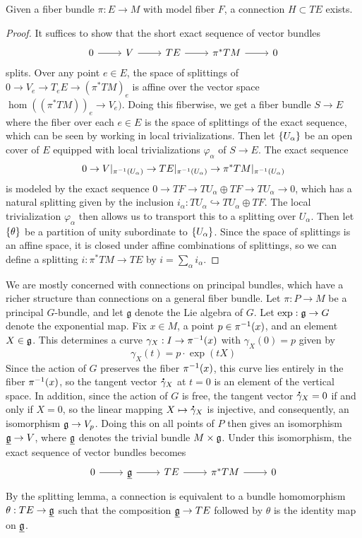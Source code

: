 %
\begin{prop}
Given a fiber bundle $\pi : E \to M$ with model fiber $F$, a connection
$H \subset TE$ exists.
\end{prop}
%
\begin{proof}
It suffices to show that the short exact sequence of vector bundles
\[\begin{tikzcd}
0 \ar[r] & V \ar[r] & TE \ar[r] & \pi^*TM \ar[r] & 0
\end{tikzcd}\]
splits. Over any point $e \in E$, the space of splittings of
$0 \to V_e \to T_eE \to (\pi^*TM)_e$ is affine over the vector space
$\hom((\pi^*TM))_e \to V_e)$. Doing this fiberwise, we get a fiber bundle
$S \to E$ where the fiber over each $e \in E$ is the space of splittings
of the exact sequence, which can be seen by working in local trivializations.
Then let $\left\lbrace U_\alpha \right\rbrace$ be an open cover of $E$ equipped with local
trivializations $\varphi_\alpha$ of $S \to E$. The exact sequence
\[
0 \to V\vert_{\pi^{-1}(U_\alpha)} \to TE\vert_{\pi^{-1}(U_\alpha)} \to
\pi^*TM\vert_{\pi^{-1}(U_\alpha)}
\]
is modeled by the exact sequence $0 \to TF \to TU_\alpha \oplus TF \to TU_\alpha \to 0$,
which has a natural splitting given by the inclusion
$i_\alpha : TU_\alpha \hookrightarrow TU_\alpha \oplus TF$. The local trivialization
$\varphi_\alpha$ then allows us to transport this to a splitting over $U_\alpha$.
Then let $\left\lbrace \theta \right\rbrace$ be a partition of unity subordinate to $\left\lbrace U_\alpha \right\rbrace$.
Since the space of splittings is an affine space, it is closed under affine
combinations of splittings, so we can define a splitting
$i : \pi^*TM \to TE$ by $i = \sum_\alpha i_\alpha$.
\end{proof}
We are mostly concerned with connections on principal bundles, which have a
richer structure than connections on a general fiber bundle. Let $\pi : P \to M$
be a principal $G$-bundle, and let $\mathfrak{g}$ denote the Lie algebra of $G$.
Let $\exp : \mathfrak{g} \to G$ denote the exponential map. Fix $x \in M$, a point
$p \in \pi^{-1}(x)$, and an element $X \in \mathfrak{g}$. This determines a curve
$\gamma_X : I \to \pi^{-1}(x)$ with $\gamma_X(0) = p$ given by
\[
\gamma_X(t) = p \cdot \exp(tX)
\]
Since the action of $G$ preserves the fiber $\pi^{-1}(x)$, this curve lies
entirely in the fiber $\pi^{-1}(x)$, so the tangent vector $\accentset{\mbox{\large\bfseries .}}{\gamma}_X$
at $t = 0$ is an element of the vertical space. In addition, since the
action of $G$ is free, the tangent vector $\accentset{\mbox{\large\bfseries .}}{\gamma}_X = 0$ if and only if
$X = 0$, so the linear mapping $X \mapsto \accentset{\mbox{\large\bfseries .}}{\gamma}_X$ is injective, and
consequently, an isomorphism $\mathfrak{g} \to V_p$. Doing this on all points of $P$
then gives an isomorphism $\underline{\mathfrak{g}} \to V$, where $\underline{\mathfrak{g}}$ denotes
the trivial bundle $M \times \mathfrak{g}$. Under this isomorphism, the exact
sequence of vector bundles becomes
\[\begin{tikzcd}
0 \ar[r] & \underline{\g} \ar[r] & TE \ar[r] & \pi^*TM \ar[r] & 0
\end{tikzcd}\]
By the splitting lemma, a connection is equivalent to a bundle homomorphism
$\theta : TE \to \underline{\mathfrak{g}}$ such that the composition $\underline{\mathfrak{g}} \to TE$
followed by $\theta$ is the identity map on $\underline{\mathfrak{g}}$.
\fi
%
